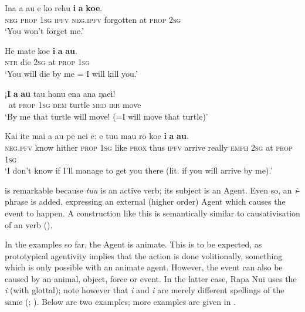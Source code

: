 \ea\label{ex:8.156}
\gll {\ꞌ}Ina a au e ko rehu \textbf{i} \textbf{a} \textbf{koe}.\\
\textsc{neg} \textsc{prop} \textsc{1sg} \textsc{ipfv} \textsc{neg.ipfv} forgotten at \textsc{prop} \textsc{2sg}\\

\glt 
‘You won’t forget me.’ \textstyleExampleref{[R226.006]} 
\z

\ea\label{ex:8.157}
\gll He mate koe \textbf{i} \textbf{a} \textbf{au}. \\
\textsc{ntr} die \textsc{2sg} at \textsc{prop} \textsc{1sg} \\

\glt 
‘You will die by me = I will kill you.’ \textstyleExampleref{[Mtx-3-01.147]}
\z

\ea\label{ex:8.158}
\gll ¡\textbf{I} \textbf{a} \textbf{au} tau honu ena ana ŋae{\ꞌ}i!\\
~at \textsc{prop} \textsc{1sg} \textsc{dem} turtle \textsc{med} \textsc{irr} move\\

\glt 
‘By me that turtle will move! (=I will move that turtle)’ \textstyleExampleref{[MsE-028.002]}
\z

\ea\label{ex:8.159}
\gll Kai {\ꞌ}ite mai a au pē nei ē: e tu{\ꞌ}u mau rō koe \textbf{i} \textbf{a} \textbf{au}. \\
\textsc{neg.pfv} know hither \textsc{prop} \textsc{1sg} like \textsc{prox} thus \textsc{ipfv} arrive really \textsc{emph} \textsc{2sg} at \textsc{prop} \textsc{1sg} \\

\glt
‘I don’t know if I’ll manage to get you there (lit. if you will arrive by me).’ \textstyleExampleref{[R314.049]} 
\z

	 is remarkable because \textit{tu{\ꞌ}u} is an active verb; its subject is an Agent. Even so, an  \textit{i}{}-phrase is added, expressing an external (higher order) Agent which causes the event to happen. A construction like this is semantically similar to causativisation of an  verb ().

In the examples so far, the Agent  is animate. This is to be expected, as prototypical agentivity implies that the action is done volitionally, something which is only possible with an animate agent. However, the event can also be caused by an animal, object, force or event. In the latter case, Rapa Nui  uses the  \textit{{\ꞌ}i} (with glottal); note however that \textit{i} and \textit{{\ꞌ}i} are merely different spellings of the same  (; ). Below are two examples; more examples are given in .

